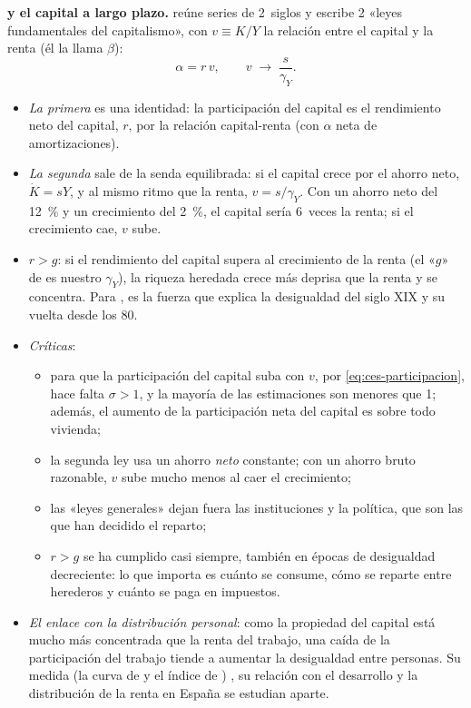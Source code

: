 \documentclass[11pt]{article}
\begin{document}
\begin{anotaciones}
\textbf{ y el capital a largo plazo.} \textcite{Piketty2014} reúne series de 2~siglos y escribe 2 «leyes fundamentales del capitalismo», con $v\equiv K/Y$ la relación entre el capital y la renta (él la llama $\beta$):
\begin{equation}
\alpha=r\,v,\qquad v\;\longrightarrow\;\frac{s}{\gamma_Y}.\label{eq:piketty}
\end{equation}
\begin{itemize}
\item \emph{La primera} es una identidad: la participación del capital es el rendimiento neto del capital, $r$, por la relación capital-renta (con $\alpha$ neta de amortizaciones).
\item \emph{La segunda} sale de la senda equilibrada: si el capital crece por el ahorro neto, $\dot K=sY$, y al mismo ritmo que la renta, $v=s/\gamma_Y$. Con un ahorro neto del 12~\% y un crecimiento del 2~\%, el capital sería 6~veces la renta; si el crecimiento cae, $v$ sube.
\item \emph{$r>g$}: si el rendimiento del capital supera al crecimiento de la renta (el «$g$» de  es nuestro $\gamma_Y$), la riqueza heredada crece más deprisa que la renta y se concentra. Para , es la fuerza que explica la desigualdad del siglo XIX y su vuelta desde los 80.
\item \emph{Críticas}:
  \begin{itemize}
  \item para que la participación del capital suba con $v$, por \eqref{eq:ces-participacion}, hace falta $\sigma>1$, y la mayoría de las estimaciones son menores que 1; además, el aumento de la participación neta del capital es sobre todo vivienda\nocite{Rognlie2015};
  \item la segunda ley usa un ahorro \emph{neto} constante; con un ahorro bruto razonable, $v$ sube mucho menos al caer el crecimiento\nocite{KrusellSmith2015};
  \item las «leyes generales» dejan fuera las instituciones y la política, que son las que han decidido el reparto\nocite{AcemogluRobinson2015};
  \item $r>g$ se ha cumplido casi siempre, también en épocas de desigualdad decreciente: lo que importa es cuánto se consume, cómo se reparte entre herederos y cuánto se paga en impuestos\nocite{Mankiw2015}.
  \end{itemize}
\item \emph{El enlace con la distribución personal}: como la propiedad del capital está mucho más concentrada que la renta del trabajo, una caída de la participación del trabajo tiende a aumentar la desigualdad entre personas. Su medida (la curva de  y el índice de ) , su relación con el desarrollo  y la distribución de la renta en España  se estudian aparte.
\end{itemize}
\end{anotaciones}
\end{document}
